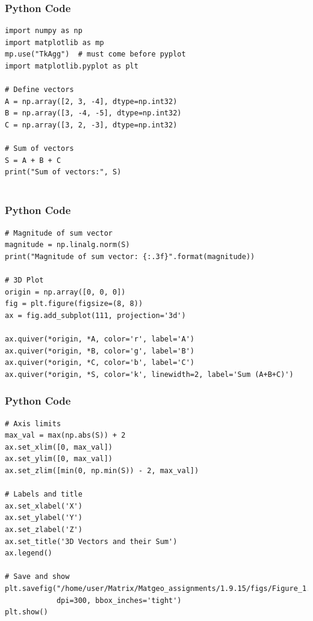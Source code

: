 \documentclass{beamer}
\begin{document}
\begin{frame}[fragile]
    \frametitle{Python Code}
    \begin{lstlisting}
import numpy as np
import matplotlib as mp
mp.use("TkAgg")  # must come before pyplot
import matplotlib.pyplot as plt

# Define vectors
A = np.array([2, 3, -4], dtype=np.int32)
B = np.array([3, -4, -5], dtype=np.int32)
C = np.array([3, 2, -3], dtype=np.int32)

# Sum of vectors
S = A + B + C
print("Sum of vectors:", S)


    \end{lstlisting}
\end{frame}

\begin{frame}[fragile]
    \frametitle{Python Code}
    \begin{lstlisting}
# Magnitude of sum vector
magnitude = np.linalg.norm(S)
print("Magnitude of sum vector: {:.3f}".format(magnitude))

# 3D Plot
origin = np.array([0, 0, 0])
fig = plt.figure(figsize=(8, 8))
ax = fig.add_subplot(111, projection='3d')

ax.quiver(*origin, *A, color='r', label='A')
ax.quiver(*origin, *B, color='g', label='B')
ax.quiver(*origin, *C, color='b', label='C')
ax.quiver(*origin, *S, color='k', linewidth=2, label='Sum (A+B+C)')

    \end{lstlisting}
\end{frame}

\begin{frame}[fragile]
    \frametitle{Python Code}
    \begin{lstlisting}
# Axis limits
max_val = max(np.abs(S)) + 2
ax.set_xlim([0, max_val])
ax.set_ylim([0, max_val])
ax.set_zlim([min(0, np.min(S)) - 2, max_val])

# Labels and title
ax.set_xlabel('X')
ax.set_ylabel('Y')
ax.set_zlabel('Z')
ax.set_title('3D Vectors and their Sum')
ax.legend()

# Save and show
plt.savefig("/home/user/Matrix/Matgeo_assignments/1.9.15/figs/Figure_1.png",
            dpi=300, bbox_inches='tight')
plt.show()

    \end{lstlisting}
\end{frame}
\end{document}
